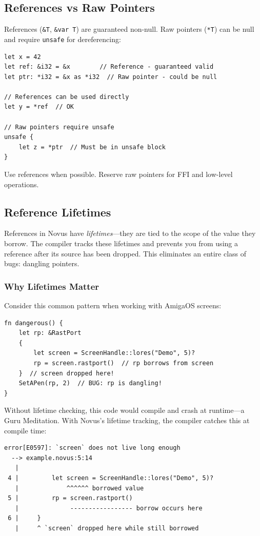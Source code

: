 \subsection{References vs Raw Pointers}

References (\texttt{\&T}, \texttt{\&var T}) are guaranteed non-null. Raw pointers (\texttt{*T}) can be null and require \texttt{unsafe} for dereferencing:

\begin{lstlisting}
let x = 42
let ref: &i32 = &x        // Reference - guaranteed valid
let ptr: *i32 = &x as *i32  // Raw pointer - could be null

// References can be used directly
let y = *ref  // OK

// Raw pointers require unsafe
unsafe {
    let z = *ptr  // Must be in unsafe block
}
\end{lstlisting}

Use references when possible. Reserve raw pointers for FFI and low-level operations.

\subsection{Reference Lifetimes}
\label{sec:lifetimes}

References in Novus have \textit{lifetimes}---they are tied to the scope of the value they borrow. The compiler tracks these lifetimes and prevents you from using a reference after its source has been dropped. This eliminates an entire class of bugs: dangling pointers.

\subsubsection{Why Lifetimes Matter}

Consider this common pattern when working with AmigaOS screens:

\begin{lstlisting}
fn dangerous() {
    let rp: &RastPort
    {
        let screen = ScreenHandle::lores("Demo", 5)?
        rp = screen.rastport()  // rp borrows from screen
    }  // screen dropped here!
    SetAPen(rp, 2)  // BUG: rp is dangling!
}
\end{lstlisting}

Without lifetime checking, this code would compile and crash at runtime---a Guru Meditation. With Novus's lifetime tracking, the compiler catches this at compile time:

\begin{verbatim}
error[E0597]: `screen` does not live long enough
  --> example.novus:5:14
   |
 4 |         let screen = ScreenHandle::lores("Demo", 5)?
   |             ^^^^^^ borrowed value
 5 |         rp = screen.rastport()
   |              ----------------- borrow occurs here
 6 |     }
   |     ^ `screen` dropped here while still borrowed
\end{verbatim}

